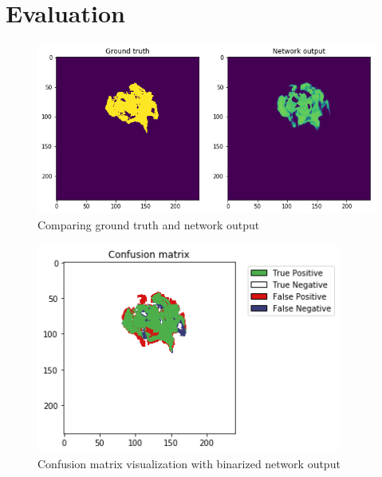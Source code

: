 \section{Evaluation}

\begin{figure}[H]
\centering
\includegraphics[width=12cm]{chapters/04_segmentation/images/network_output.png}
\caption{Comparing ground truth and network output}
\end{figure}

\begin{figure}[H]
\centering
\caption{Confusion matrix visualization with binarized network output}
\includegraphics[width=10cm]{chapters/04_segmentation/images/confusion_matrix.png}
\end{figure}
